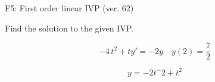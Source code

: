 \begin{exercise}
  \begin{exerciseTitle}F5: First order linear IVP (ver. 62)\end{exerciseTitle}
  \begin{exerciseStatement}
    
Find the solution to the given IVP.

    
\[-4 \, t^{2} +ty'= -2 y \hspace{1em} y( 2 ) = \frac{7}{2}\]

  \end{exerciseStatement}
  \begin{exerciseAnswer}
    
\[y= -2 t^ -2 + t^{2}\]

  \end{exerciseAnswer}
\end{exercise}